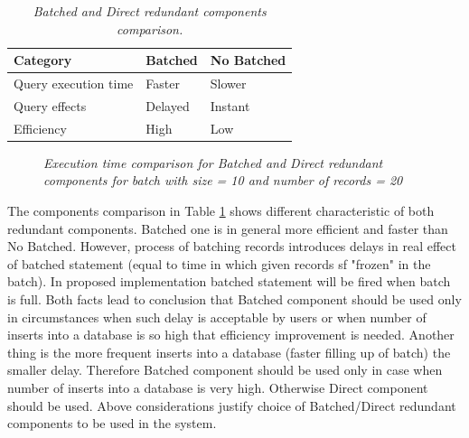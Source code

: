 \documentclass[12pt,a4paper]{article}
\begin{document}
\begin{table}[!htb]
\def\arraystretch{1.5}
\caption{\textit{Batched and Direct redundant components comparison.}}\label{batchedcomponents}
\begin{tabularx}{\textwidth}{p{4cm}|X|X}
  \textbf{Category} &\textbf{Batched} & \textbf{No Batched} \\
\hline
Query execution time & Faster & Slower \\
Query effects & Delayed & Instant\\
Efficiency & High & Low\\
\end{tabularx}
\end{table}

\begin{figure}[!htb]
\centering
{}
\caption{\textit{Execution time comparison for Batched and Direct redundant components for batch with size = 10 and number of records = 20}} \label{fig:batchedtime}
\end{figure}

The components comparison in Table \ref{batchedcomponents} shows different characteristic of both redundant components. Batched one is in general more efficient and faster than No Batched. However, process of batching records introduces delays in real effect of batched statement (equal to time in which given records sf "frozen" in the batch). In proposed implementation batched statement will be fired when batch is full. Both facts lead to conclusion that Batched component should be used only in circumstances when such delay is acceptable by users or when number of inserts into a database is so high that efficiency improvement is needed. Another thing is the more frequent inserts into a database (faster filling up of batch) the smaller delay. Therefore Batched component should be used only in case when number of inserts into a database is very high. Otherwise Direct component should be used. Above considerations justify choice of Batched/Direct redundant components to be used in the system.   
\end{document}
